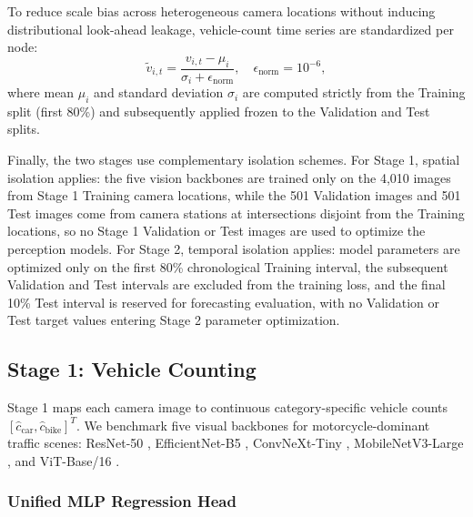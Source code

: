 \documentclass[preprint,12pt]{elsarticle}
\begin{document}
To reduce scale bias across heterogeneous camera locations without inducing distributional look-ahead leakage, vehicle-count time series are standardized per node:
\begin{equation}
\tilde{v}_{i,t}
=
\frac{v_{i,t} - \mu_i}
{\sigma_i + \epsilon_{\mathrm{norm}}},
\quad
\epsilon_{\mathrm{norm}} = 10^{-6},
\end{equation}
where mean $\mu_i$ and standard deviation $\sigma_i$ are computed strictly from the Training split (first 80\%) and subsequently applied frozen to the Validation and Test splits.

Finally, the two stages use complementary isolation schemes. For Stage 1, spatial isolation applies: the five vision backbones are trained only on the 4,010 images from Stage 1 Training camera locations, while the 501 Validation images and 501 Test images come from camera stations at intersections disjoint from the Training locations, so no Stage 1 Validation or Test images are used to optimize the perception models. For Stage 2, temporal isolation applies: model parameters are optimized only on the first 80\% chronological Training interval, the subsequent Validation and Test intervals are excluded from the training loss, and the final 10\% Test interval is reserved for forecasting evaluation, with no Validation or Test target values entering Stage 2 parameter optimization.


\subsection{Stage 1: Vehicle Counting}
\label{sec:subproblem1}

Stage 1 maps each camera image to continuous category-specific vehicle counts $[\hat{c}_{\text{car}}, \hat{c}_{\text{bike}}]^T$. We benchmark five visual backbones for motorcycle-dominant traffic scenes: ResNet-50 \citep{resnet}, EfficientNet-B5 \citep{efficientnet}, ConvNeXt-Tiny \citep{convnext}, MobileNetV3-Large \citep{mobilenet}, and ViT-Base/16 \citep{vit}.

\subsubsection{Unified MLP Regression Head}
\end{document}
